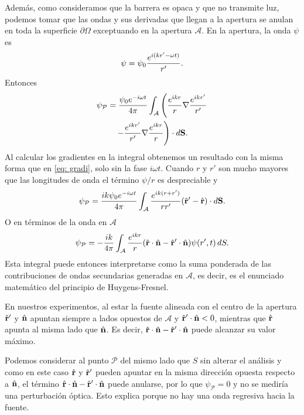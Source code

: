 \begin{multicols}{2}
Además, como consideramos que la barrera es opaca y que no transmite luz, podemos tomar que las ondas y sus derivadas que llegan a la apertura se anulan en toda la superficie $\partial \Omega$ exceptuando en la apertura $\mathcal A$. En la apertura, la onda $\psi$ es
\begin{equation}
	\psi = \psi_0\frac{e^{i(kr' - \omega t)}}{r'}.
\end{equation}
Entonces
\begin{multline}
	\psi_{\mathcal P} = \frac{\psi_0 e^{-i\omega t}}{4\pi} \int_{\mathcal A} \left (\frac{e^{ikr}}{r}  \nabla \frac{e^{ikr'}}{r'} \right.\\
	 \left. -  \frac{e^{ikr'}}{r'}  \nabla \frac{e^{ikr}}{r} \right ) \cdot d\mathbf S.
\end{multline}
Al calcular los gradientes en la integral obtenemos un resultado con la misma forma que en \eqref{eq: gradi}, solo sin la fase $i\omega t$. Cuando $r$ y $r'$ son mucho mayores que las longitudes de onda el término $\psi/r$ es despreciable y
\begin{equation}
	\psi_{\mathcal P} = \frac{ik \psi_0 e^{-i\omega t}}{4\pi} \int_{\mathcal A} \frac{e^{ik(r+r')}}{rr'}  (\hat{\mathbf{r}}' - \hat{\mathbf{r}})
	  \cdot d\mathbf S.
\end{equation}
O en términos de la onda en $\mathcal A$
\begin{equation}\label{eq: almost}
	\psi_{\mathcal P} = -\frac{ik}{4\pi} \int_{\mathcal A} \frac{e^{ikr}}{r}  (\hat{\mathbf{r}} \cdot \hat{\mathbf{n}} - \hat{\mathbf{r}}' \cdot \hat{\mathbf{n}}) \psi(r', t)\, dS.
\end{equation}
Esta integral puede entonces interpretarse como la suma ponderada de las contribuciones de ondas secundarias generadas en $\mathcal A$, es decir, es el enunciado matemático del principio de Huygens-Fresnel.

En nuestros experimentos, al estar la fuente alineada con el centro de la apertura $\hat{\mathbf{r}}'$ y $\hat{\mathbf{n}}$ apuntan siempre a lados opuestos de $\mathcal A$ y $\hat{\mathbf{r}}' \cdot \hat{\mathbf{n}} < 0$, mientras que $\hat{\mathbf{r}}$ apunta al misma lado que $\hat{\mathbf{n}}$. Es decir, $\hat{\mathbf{r}} \cdot \hat{\mathbf{n}} - \hat{\mathbf{r}}' \cdot \hat{\mathbf{n}}$ puede alcanzar su valor máximo.

Podemos considerar al punto $\mathcal P$ del mismo lado que $S$ sin alterar el análisis y como en este caso $\hat{\mathbf{r}}$ y $\hat{\mathbf{r}}'$ pueden apuntar en la misma dirección opuesta respecto a $\hat{\mathbf{n}}$, el término $\hat{\mathbf{r}} \cdot \hat{\mathbf{n}} - \hat{\mathbf{r}}' \cdot \hat{\mathbf{n}}$ puede anularse, por lo que $\psi_{\mathcal P} = 0$ y no se mediría una perturbación óptica. Esto explica porque no hay una onda regresiva hacia la fuente.


\end{multicols}
